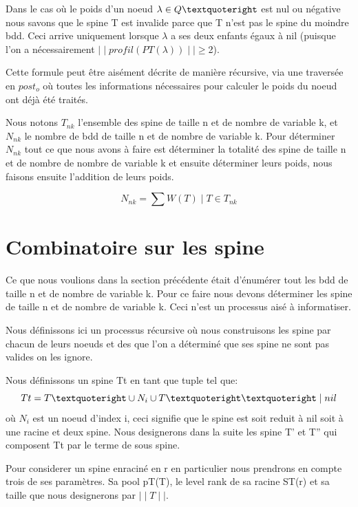 \documentclass[french]{article}
\begin{document}
Dans le cas où le poids d'un noeud \(\lambda \in Q\textquoteright\) est nul ou négative nous savons que le spine T est invalide parce que T n'est pas le spine du moindre bdd. Ceci arrive uniquement lorsque \(\lambda\) a ses deux enfants égaux à nil (puisque l'on a nécessairement \(\mid\mid profil(PT(\lambda)) \mid\mid \geq\)2).

Cette formule peut être aisément décrite de manière récursive, via une traversée en \(post_{o}\) où toutes les informations nécessaires pour calculer le poids du noeud ont déjà été traités.
\vspace{5mm} %

Nous notons \(T_{nk}\) l'ensemble des spine de taille n et de nombre de variable k, et \(N_{nk}\) le nombre de bdd de taille n et de nombre de variable k.
Pour déterminer \(N_{nk}\) tout ce que nous avons à faire est déterminer la totalité des spine de taille n et de nombre de nombre de variable k et ensuite déterminer leurs poids, nous faisons ensuite l'addition de leurs poids.

\[N_{nk} = \sum W(T) \mid T \in T_{nk}\]

\section{Combinatoire sur les spine}
Ce que nous voulions dans la section précédente était d'énumérer tout les bdd de taille n et de nombre de variable k. Pour ce faire nous devons déterminer les spine de taille n et de nombre de variable k. Ceci n'est un processus aisé à informatiser.

Nous définissons ici un processus récursive où nous construisons les spine par chacun de leurs noeuds et des que l'on a déterminé que ses spine ne sont pas valides on les ignore. 
\vspace{5mm} %

Nous définissons un spine Tt en tant que tuple tel que:
\[Tt = T\textquoteright \cup N_i \cup T\textquoteright\textquoteright \mid nil \]
où \(N_i\) est un noeud d'index i, ceci signifie que le spine est soit reduit à nil soit à une racine et deux spine. Nous designerons dans la suite les spine T' et T'' qui composent Tt par le terme de sous spine.

Pour considerer un spine enraciné en r en particulier nous prendrons en compte trois de ses paramètres. Sa pool pT(T), le level rank de sa racine ST(r) et sa taille que nous designerons par \(\mid\mid T\mid\mid\).
\end{document}
